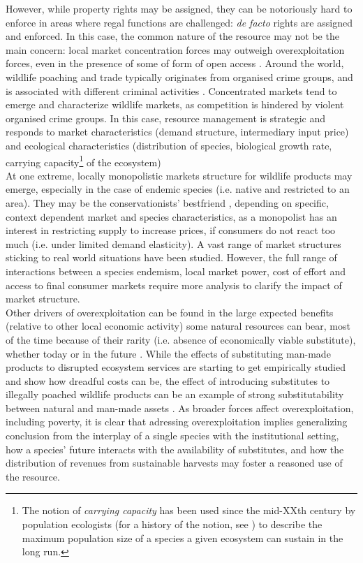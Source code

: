 	 However, while property rights may be assigned, they can be notoriously hard to enforce in areas where regal functions are challenged: \textit{de facto} rights are assigned and enforced. In this case, the common nature of the resource may not be the main concern: local market concentration forces may outweigh overexploitation forces, even in the presence of some of form of open access \citep{damania_economics_2007}. 
Around the world, wildlife poaching and trade typically originates from organised crime groups, and is associated with different criminal activities \citep{mozer_introduction_2023}.  Concentrated markets tend to emerge and characterize wildlife markets, as competition is hindered by violent organised crime groups. In this case, resource management is strategic and responds to market characteristics (demand structure, intermediary input price) and ecological characteristics (distribution of species, biological growth rate, carrying capacity\footnote{The notion of \textit{carrying capacity} has been used since the mid-XXth century by population ecologists (for a history of the notion, see \cite{sayre_carrying_2008}) to describe the maximum population size of a species a given ecosystem can sustain in the long run.} of the ecosystem)\\
	At one extreme, locally monopolistic markets structure for wildlife products may emerge, especially in the case of endemic species (i.e. native and restricted to an area).
They may be the conservationists' bestfriend \citep{solow_resources_1974, hannesson_note_1983}, depending on specific, context dependent market and species characteristics, as a monopolist has an interest in restricting supply to increase prices, if consumers do not react too much (i.e. under limited demand elasticity). A vast range of  market structures \citep{damania_economics_2007, hannesson_effects_1985} sticking to real world situations have been studied. However, the full range of interactions between a species endemism, local market power, cost of effort and access to final consumer markets require more analysis to clarify the impact of market structure.\\
	Other drivers of overexploitation can be found in the large expected benefits (relative to other local economic activity) some natural resources can bear, most of the time because of their rarity (i.e. absence of economically viable substitute), whether today or in the future \citep{Kremer2000}. While the effects of substituting man-made products to disrupted ecosystem services are starting to get empirically studied \citep{frank_economic_2024} and show how dreadful costs can be, the effect of introducing substitutes to illegally poached wildlife products can be an example of strong substitutability between natural and man-made assets \citep{chen_economics_2017}. As broader forces affect overexploitation, including poverty, it is clear that adressing overexploitation implies generalizing conclusion from the interplay of a single species with the institutional setting, how a  species' future interacts with the availability of substitutes, and how the distribution of revenues from sustainable harvests may foster a reasoned use of the resource. 
	
